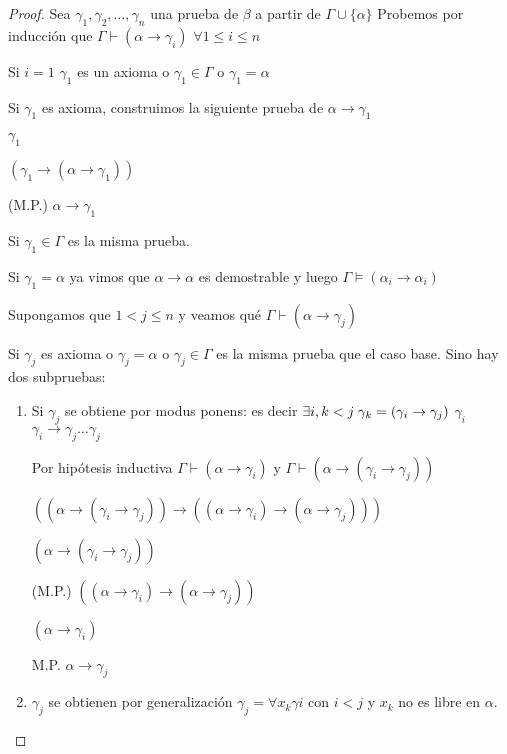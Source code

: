 \begin{proof}

Sea $\gamma_1, \gamma_2, \ldots, \gamma_n$ una prueba de $\beta$ a partir de $\Gamma \cup \{ \alpha\}$ Probemos por inducci\'on que $\Gamma \vdash (\alpha \rightarrow \gamma_i)$ $\forall 1 \leq i \leq n$

Si $i = 1$ $\gamma_1$ es un axioma o $\gamma_1 \in \Gamma$ o $\gamma_1 = \alpha$

Si $\gamma_1$ es axioma, construimos la siguiente prueba de $\alpha \rightarrow \gamma_1$

$\gamma_1$

$(\gamma_1 \rightarrow (\alpha \rightarrow \gamma_1))$

(M.P.) $\alpha \rightarrow \gamma_1$

Si $\gamma_1 \in \Gamma$ es la misma prueba. 

Si $\gamma_1 = \alpha$ ya vimos que $\alpha \rightarrow \alpha$ es demostrable y luego $\Gamma \models (\alpha_i \rightarrow \alpha_i)$

Supongamos que $1 < j \leq n$ y veamos qu\'e $\Gamma \vdash (\alpha \rightarrow \gamma_j)$

Si $\gamma_j$ es axioma o $\gamma_j = \alpha$ o $\gamma_j \in \Gamma$ es la misma prueba que el caso base. Sino hay dos subpruebas:

\begin{enumerate}
	\item Si $\gamma_j$ se obtiene por modus ponens: es decir $\exists i, k < j \; \/ \gamma_k = (\gamma_i \rightarrow \gamma_j)$ $\gamma_i$ $\gamma_i \rightarrow \gamma_j \ldots \gamma_j$
	
	Por hip\'otesis inductiva $\Gamma \vdash (\alpha \rightarrow \gamma_i)$ y $\Gamma \vdash (\alpha \rightarrow (\gamma_i \rightarrow \gamma_j))$
	
	$((\alpha \rightarrow (\gamma_i \rightarrow \gamma_j)) \rightarrow ( (\alpha \rightarrow \gamma_i) \rightarrow (\alpha \rightarrow \gamma_j)))$ 
	
	$(\alpha \rightarrow (\gamma_i \rightarrow \gamma_j))$
	
	(M.P.) $((\alpha \rightarrow \gamma_i) \rightarrow (\alpha \rightarrow \gamma_j))$
	
	$(\alpha \rightarrow \gamma_i)$
	
	M.P. $\alpha \rightarrow \gamma_j$
	
	\item $\gamma_j$ se obtienen por generalizaci\'on $\gamma_j = \forall x_k \gamma i$ con $i < j$ y $x_k$ no es libre en $\alpha$.
	

\end{enumerate}
\end{proof}
